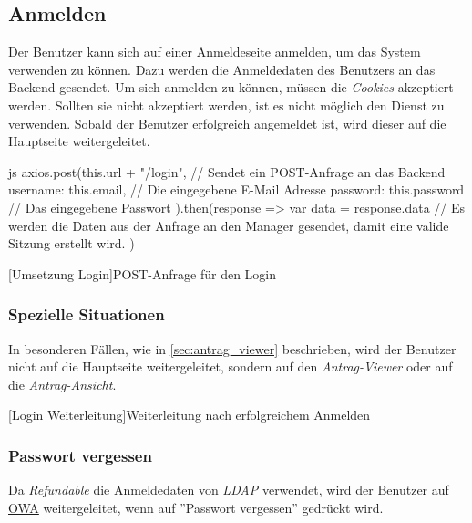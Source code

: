\subsection{Anmelden}
Der Benutzer kann sich auf einer Anmeldeseite anmelden, um das System verwenden zu können. Dazu werden die Anmeldedaten des Benutzers an das Backend gesendet. Um sich anmelden zu können, müssen die \textit{Cookies} akzeptiert werden. Sollten sie nicht akzeptiert werden, ist es nicht möglich den Dienst zu verwenden.
Sobald der Benutzer erfolgreich angemeldet ist, wird dieser auf die Hauptseite weitergeleitet.
\\
\begin{code}{js}
axios.post(this.url + "/login", {	// Sendet ein POST-Anfrage an das Backend
	username: this.email,	// Die eingegebene E-Mail Adresse
	password: this.password // Das eingegebene Passwort
}).then(response => {
	var data = response.data
	// Es werden die Daten aus der Anfrage an den Manager gesendet, damit eine valide Sitzung erstellt wird.
})
\end{code}
[Umsetzung Login]{POST-Anfrage für den Login}~\\

\subsubsection{Spezielle Situationen}
In besonderen Fällen, wie in \autoref{sec:antrag_viewer} beschrieben, wird der Benutzer nicht auf die Hauptseite weitergeleitet, sondern auf den \textit{Antrag-Viewer} oder auf die \textit{Antrag-Ansicht}.
[Login Weiterleitung]{Weiterleitung nach erfolgreichem Anmelden}~\\
\subsubsection{Passwort vergessen}
Da \textit{Refundable} die Anmeldedaten von \textit{LDAP} verwendet, wird der Benutzer auf \href{https://owa.tgm.ac.at}{OWA} weitergeleitet, wenn auf ''Passwort vergessen'' gedrückt wird.
\newpage
